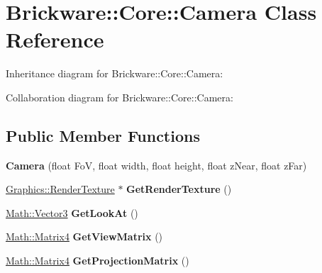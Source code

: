 \hypertarget{classBrickware_1_1Core_1_1Camera}{}\section{Brickware\+:\+:Core\+:\+:Camera Class Reference}
\label{classBrickware_1_1Core_1_1Camera}


Inheritance diagram for Brickware\+:\+:Core\+:\+:Camera\+:


Collaboration diagram for Brickware\+:\+:Core\+:\+:Camera\+:
\subsection*{Public Member Functions}
\begin{DoxyCompactItemize}
\item 
\hypertarget{classBrickware_1_1Core_1_1Camera_a9e7dda51cc4cb9b8a69771a65ecb5be8}{}{\bfseries Camera} (float Fo\+V, float width, float height, float z\+Near, float z\+Far)\label{classBrickware_1_1Core_1_1Camera_a9e7dda51cc4cb9b8a69771a65ecb5be8}

\item 
\hypertarget{classBrickware_1_1Core_1_1Camera_aea8c1322df267f451f1a8ce018b3f84a}{}\hyperlink{classBrickware_1_1Graphics_1_1RenderTexture}{Graphics\+::\+Render\+Texture} $\ast$ {\bfseries Get\+Render\+Texture} ()\label{classBrickware_1_1Core_1_1Camera_aea8c1322df267f451f1a8ce018b3f84a}

\item 
\hypertarget{classBrickware_1_1Core_1_1Camera_a9326c9ed28ae07e5fc36cfa52659aa17}{}\hyperlink{classBrickware_1_1Math_1_1Vector3}{Math\+::\+Vector3} {\bfseries Get\+Look\+At} ()\label{classBrickware_1_1Core_1_1Camera_a9326c9ed28ae07e5fc36cfa52659aa17}

\item 
\hypertarget{classBrickware_1_1Core_1_1Camera_a63ed5c7d6f8ec12c87142df82557a920}{}\hyperlink{classBrickware_1_1Math_1_1Matrix4}{Math\+::\+Matrix4} {\bfseries Get\+View\+Matrix} ()\label{classBrickware_1_1Core_1_1Camera_a63ed5c7d6f8ec12c87142df82557a920}

\item 
\hypertarget{classBrickware_1_1Core_1_1Camera_a6a6bf78f9a2568887a3f2cc4256841cf}{}\hyperlink{classBrickware_1_1Math_1_1Matrix4}{Math\+::\+Matrix4} {\bfseries Get\+Projection\+Matrix} ()\label{classBrickware_1_1Core_1_1Camera_a6a6bf78f9a2568887a3f2cc4256841cf}


\end{DoxyCompactItemize}
